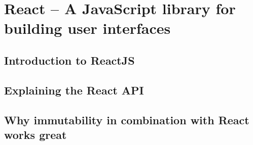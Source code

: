 \chapter{React – A JavaScript library for building user interfaces}
\label{cha:react}

\section{Introduction to ReactJS}

\section{Explaining the React API}

\section{Why immutability in combination with React works great}
